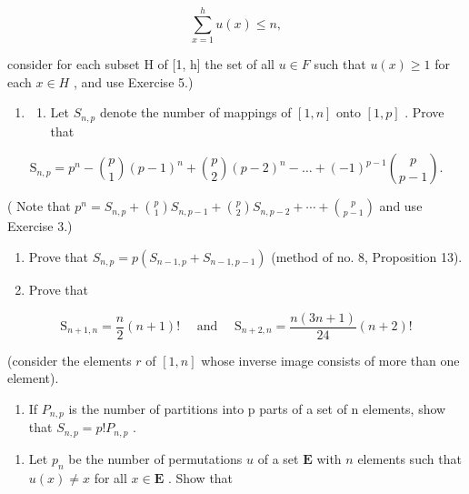 \[
\sum_ {x = 1} ^ {h} u (x) \leqslant n,
\]

consider for each subset H of {[}1, h{]} the set of all \(u \in F\) such that \(u(x) \geqslant 1\) for each \(x \in H\) , and use Exercise 5.)

\begin{enumerate}
\def\labelenumi{\arabic{enumi}.}
\setcounter{enumi}{6}
\tightlist
\item
  \begin{enumerate}
  \def\labelenumii{(\alph{enumii})}
  \tightlist
  \item
    Let \(S_{n,p}\) denote the number of mappings of \([1, n]\) onto \([1, p]\) . Prove that
  \end{enumerate}
\end{enumerate}

\[
\mathrm{S} _ {n, p} = p ^ {n} - \binom {p} {1} (p - 1) ^ {n} + \binom {p} {2} (p - 2) ^ {n} - \dots + (- 1) ^ {p - 1} \binom {p} {p - 1}.
\]

( Note that \(p^{n} = S_{n,p} + \binom{p}{1} S_{n,p-1} + \binom{p}{2} S_{n,p-2} + \cdots + \binom{p}{p-1}\) and use Exercise 3.)

\begin{enumerate}
\def\labelenumi{(\alph{enumi})}
\setcounter{enumi}{1}
\item
  Prove that \(S_{n,p} = p(S_{n-1,p} + S_{n-1,p-1})\) (method of no. 8, Proposition 13).
\item
  Prove that
\end{enumerate}

\[
\mathrm{S} _ {n + 1, n} = \frac {n}{2} (n + 1)! \quad \text { and } \quad \mathrm{S} _ {n + 2, n} = \frac {n (3 n + 1)}{2 4} (n + 2)!
\]

(consider the elements \(r\) of \([1, n]\) whose inverse image consists of more than one element).

\begin{enumerate}
\def\labelenumi{(\alph{enumi})}
\setcounter{enumi}{3}
\tightlist
\item
  If \(P_{n,p}\) is the number of partitions into p parts of a set of n elements, show that \(S_{n,p} = p!P_{n,p}\) .
\end{enumerate}

\begin{enumerate}
\def\labelenumi{\arabic{enumi}.}
\setcounter{enumi}{7}
\tightlist
\item
  Let \(p_n\) be the number of permutations \(u\) of a set \(\mathbf{E}\) with \(n\) elements such that \(u(x) \neq x\) for all \(x \in \mathbf{E}\) . Show that
\end{enumerate}

